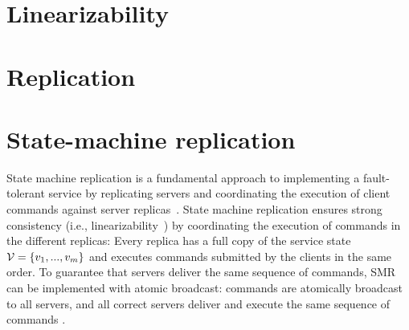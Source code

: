 \section{Linearizability}
\lipsum[1-2]

\section{Replication}
\lipsum[1-2]

\section{State-machine replication}
\label{sec:smr}

State machine replication is a fundamental approach to implementing a
fault-tolerant service by replicating servers and coordinating the execution of
client commands against server replicas~\cite{Lam78,Sch90}. State machine
replication ensures strong consistency (i.e., linearizability~\cite{Attiya04})
by coordinating the execution of commands in the different replicas: Every
replica has a full copy of the service state $\mathcal{V} = \{v_1, ..., v_m\}$ and
executes commands submitted by the clients in the same order. To guarantee that
servers deliver the same sequence of commands, SMR can be implemented with
atomic broadcast: commands are atomically broadcast to all servers, and all
correct servers deliver and execute the same sequence of commands
\cite{BJ87b,DSU04}.
